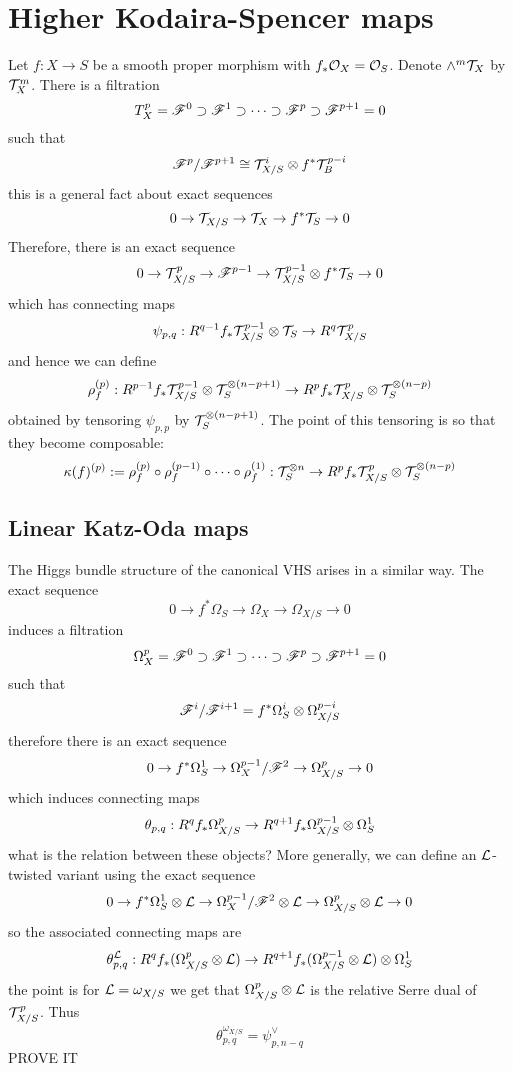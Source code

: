 \documentclass[12pt]{article}
\begin{document}
\section{Higher Kodaira-Spencer maps}

Let $f : X \to S$ be a smooth proper morphism with $f_* \mathcal{O}_{X} = \mathcal{O}_{S}$. Denote $\wedge^m \mathcal{T}_X$ by $\mathcal{T}_X^m$. There is a filtration
\[ T_X^p = \mathscr{F}^0 \supset \mathscr{F}^1 \supset \cdots \supset \mathscr{F}^p \supset \mathscr{F}^{p+1} = 0 \]
such that
\[ \mathscr{F}^p / \mathscr{F}^{p+1} \cong \mathcal{T}_{X/S}^i \otimes f^* \mathcal{T}_B^{p - i} \]
this is a general fact about exact sequences
\[ 0 \to \mathcal{T}_{X/S} \to \mathcal{T}_X \to f^* \mathcal{T}_S \to 0 \]
Therefore, there is an exact sequence
\[ 0 \to \mathcal{T}_{X/S}^p \to \mathscr{F}^{p-1} \to \mathcal{T}_{X/S}^{p-1} \otimes f^* \mathcal{T}_S \to 0 \]
which has connecting maps
\[ \psi_{p,q} : R^{q-1} f_* \mathcal{T}_{X/S}^{p-1} \otimes \mathcal{T}_S \to R^{q} \mathcal{T}_{X/S}^p \]
and hence we can define
\[ \rho_f^{(p)} : R^{p-1} f_* \mathcal{T}_{X/S}^{p-1} \otimes \mathcal{T}_S^{\otimes (n - p + 1)} \to R^p f_* \mathcal{T}^p_{X/S} \otimes \mathcal{T}_S^{\otimes (n - p)} \]
obtained by tensoring $\psi_{p,p}$ by $\mathcal{T}_{S}^{\otimes (n - p + 1)}$. The point of this tensoring is so that they become composable:
\[ \kappa(f)^{(p)} := \rho_f^{(p)} \circ \rho_f^{(p-1)} \circ \cdots \circ \rho_f^{(1)}  : \mathcal{T}_{S}^{\otimes n} \to R^p f_* \mathcal{T}_{X/S}^p \otimes \mathcal{T}_S^{\otimes (n - p)} \]

\subsection{Linear Katz-Oda maps}

The Higgs bundle structure of the canonical VHS arises in a similar way. The exact sequence
\[ 0 \to f^* \Omega_S \to \Omega_{X} \to \Omega_{X/S} \to 0 \]
induces a filtration
\[ \Omega_X^p = \mathscr{F}^0 \supset \mathscr{F}^1 \supset \cdots \supset \mathscr{F}^{p} \supset \mathscr{F}^{p+1} = 0 \]
such that
\[ \mathscr{F}^i / \mathscr{F}^{i+1} = f^* \Omega_S^i \otimes \Omega_{X/S}^{p-i} \]
therefore there is an exact sequence
\[ 0 \to f^* \Omega_S^1 \to \Omega_X^{p-1} / \mathscr{F}^2 \to \Omega_{X/S}^{p} \to 0 \]
which induces connecting maps
\[ \theta_{p,q} : R^q f_* \Omega_{X/S}^p \to R^{q+1} f_* \Omega_{X/S}^{p-1} \otimes \Omega_S^1 \] 
what is the relation between these objects? More generally, we can define an $\mathcal{L}$-twisted variant using the exact sequence
\[ 0 \to f^* \Omega_S^1 \otimes \mathcal{L} \to \Omega_X^{p-1} / \mathscr{F}^2 \otimes \mathcal{L} \to \Omega_{X/S}^{p} \otimes \mathcal{L} \to 0 \]
so the associated connecting maps are
\[ \theta_{p,q}^{\mathcal{L}} : R^q f_* (\Omega_{X/S}^p \otimes \mathcal{L}) \to R^{q+1} f_* (\Omega_{X/S}^{p-1} \otimes \mathcal{L}) \otimes \Omega_S^1 \]
the point is for $\mathcal{L} = \omega_{X/S}$ we get that $\Omega_{X/S}^p \otimes \mathcal{L}$ is the relative Serre dual of $\mathcal{T}_{X/S}^p$. Thus
\[ \theta^{\omega_{X/S}}_{p,q} = \psi_{p,n-q}^{\vee} \]
{\color{red} PROVE IT}
\end{document}
